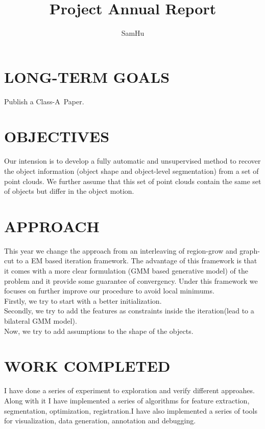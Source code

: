 \documentclass{onrannual}
\author{SamHu}
\affil{%
phone: +8615656928957  email: \href{sy891228@mail.ustc.edu.cn}{sy891228@mail.ustc.edu.cn} \\}
\title{Project Annual Report}
\begin{document}
    


\maketitle

\section{LONG-TERM GOALS}
Publish a Class-A~Paper.
\section{OBJECTIVES}
Our intension is to develop a fully automatic and unsupervised method to recover the object information (object shape and object-level segmentation) from a set of point clouds. We further assume that this set of point clouds contain the same set of objects but differ in the object motion.

\section{APPROACH}
This year we change the approach from an interleaving of region-grow and graph-cut to a EM based iteration framework. The advantage of this framework is that it comes with a more clear formulation (GMM based generative model) of the problem and it provide some guarantee of convergency. Under this framework we focuses on further improve our procedure to avoid local minimums.\\
Firstly, we try to start with a better initialization.\\
Secondly, we try to add the features as constraints inside the iteration(lead to a bilateral GMM model).\\
Now, we try to add assumptions to the shape of the objects.

\section{WORK COMPLETED}
I have done a series of experiment to exploration and verify different approahes. Along with it I have implemented a series of algorithms for feature extraction, segmentation, optimization, registration.I have also implemented a series of tools for visualization, data generation, annotation and debugging.
\end{document}
